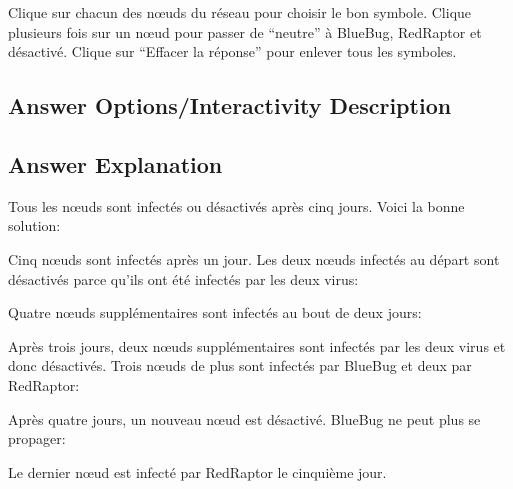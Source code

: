 \documentclass[a4paper,11pt]{report}
\newcommand{\taskGraphicsFolder}{..}
\begin{document}
Clique sur chacun des nœuds du réseau pour choisir le bon symbole. Clique plusieurs fois sur un nœud pour passer de “neutre” à BlueBug, RedRaptor et désactivé. Clique sur “Effacer la réponse” pour enlever tous les symboles.

\begingroup
\renewcommand{\arraystretch}{1.5}
\subsection*{Answer Options/Interactivity Description}



\endgroup

\subsection*{Answer Explanation}

Tous les nœuds sont infectés ou désactivés après cinq jours. Voici la bonne solution:

{\centering%
\par}

Cinq nœuds sont infectés après un jour. Les deux nœuds infectés au départ sont désactivés parce qu’ils ont été infectés par les deux virus:

{\centering%
\par}

Quatre nœuds supplémentaires sont infectés au bout de deux jours:

{\centering%
\par}

Après trois jours, deux nœuds supplémentaires sont infectés par les deux virus et donc désactivés. Trois nœuds de plus sont infectés par BlueBug et deux par RedRaptor:

{\centering%
\par}

Après quatre jours, un nouveau nœud est désactivé. BlueBug ne peut plus se propager:

{\centering%
\par}

Le dernier nœud est infecté par RedRaptor le cinquième jour.
\end{document}
